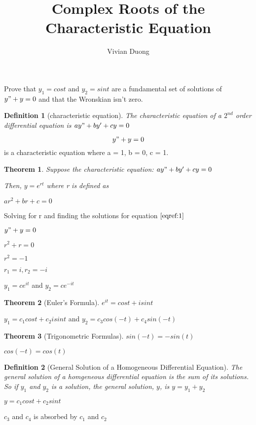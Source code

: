 \documentclass{article}
\title{Complex Roots of the Characteristic Equation}
\author{Vivian Duong}
\date{}
\newtheorem{definition}{Definition}
\newtheorem{theorem}{Theorem}[section]
\begin{document}
\maketitle

Prove that $y_1=cost$ and $y_2=sint$ are a fundamental set of solutions of $y" + y = 0$ and that the Wronskian isn't zero. 
\begin{definition}[characteristic equation]
The characteristic equation of a $2^{nd}$ order differential equation is \newline
$ay" + by' + cy = 0$
\end{definition}

\begin{equation} \label{eqref:1}
y" + y = 0 
\end{equation}
is a characteristic equation where a = 1, b = 0, c = 1.

\begin{theorem}
Suppose the characteristic equation:
$ay" + by' + cy = 0$

Then, $y = e^{rt}$ where r is defined as

$ar^2 + br + c = 0$
\end{theorem}

Solving for r and finding the solutions for equation $\eqref{eqref:1}$
\begin{center}
$y" + y = 0$

$r^2 + r = 0$

$r^2 = -1$

$r_1 = i, r_2 = -i$

$y_1 = ce^{it}$ and $y_2 = ce^{-it}$
\end{center}

\begin{theorem} [Euler's Formula]
$e^{it} = cost + isint$
\end{theorem}

$y_1 = c_1cost + c_2isint$ and $y_2 = c_3cos(-t) + c_4sin(-t)$

\begin{theorem} [Trigonometric Formulas]
$sin(-t) = -sin(t)$

$cos(-t) = cos(t)$

\end{theorem} 
\begin{definition}[General Solution of a Homogeneous Differential Equation]
The general solution of a homgeneous differential equation is the sum of its solutions. So if $y_1$ and $y_2$ is a solution, the general solution, $y$, is $y = y_1 + y_2$
\end{definition}
$y = c_1cost + c_2sint$

$c_3$ and $c_4$ is absorbed by $c_1$ and $c_2$ 
\end{document}
